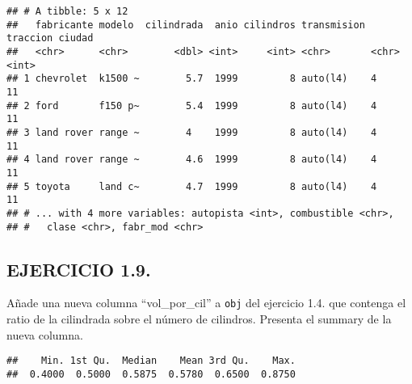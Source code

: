 \documentclass[]{article}
\newenvironment{Shaded}{\begin{snugshade}}{\end{snugshade}}
\newcommand{\CommentTok}[1]{\textcolor[rgb]{0.56,0.35,0.01}{\textit{#1}}}
\newcommand{\KeywordTok}[1]{\textcolor[rgb]{0.13,0.29,0.53}{\textbf{#1}}}
\newcommand{\NormalTok}[1]{#1}
\newcommand{\OperatorTok}[1]{\textcolor[rgb]{0.81,0.36,0.00}{\textbf{#1}}}
\newcommand{\OtherTok}[1]{\textcolor[rgb]{0.56,0.35,0.01}{#1}}
\newcommand{\StringTok}[1]{\textcolor[rgb]{0.31,0.60,0.02}{#1}}
\begin{document}
\begin{verbatim}
## # A tibble: 5 x 12
##   fabricante modelo  cilindrada  anio cilindros transmision traccion ciudad
##   <chr>      <chr>        <dbl> <int>     <int> <chr>       <chr>     <int>
## 1 chevrolet  k1500 ~        5.7  1999         8 auto(l4)    4            11
## 2 ford       f150 p~        5.4  1999         8 auto(l4)    4            11
## 3 land rover range ~        4    1999         8 auto(l4)    4            11
## 4 land rover range ~        4.6  1999         8 auto(l4)    4            11
## 5 toyota     land c~        4.7  1999         8 auto(l4)    4            11
## # ... with 4 more variables: autopista <int>, combustible <chr>,
## #   clase <chr>, fabr_mod <chr>
\end{verbatim}

\hypertarget{ejercicio-1.9.}{%
\subsection{EJERCICIO 1.9.}\label{ejercicio-1.9.}}

Añade una nueva columna ``vol\_por\_cil'' a \texttt{obj} del ejercicio
1.4. que contenga el ratio de la cilindrada sobre el número de
cilindros. Presenta el summary de la nueva columna.

\begin{Shaded}
\end{Shaded}

\begin{verbatim}
##    Min. 1st Qu.  Median    Mean 3rd Qu.    Max. 
##  0.4000  0.5000  0.5875  0.5780  0.6500  0.8750
\end{verbatim}
\end{document}
